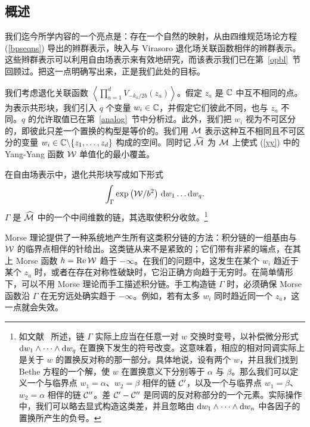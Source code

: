 \subsection{概述}\label{moreover}

我们迄今所学内容的一个亮点是：存在一个自然的映射，从由四维规范场论方程 (\ref{bpseqns}) 导出的辫群表示，映入与 Virasoro 退化场关联函数相伴的辫群表示。这些辫群表示可以利用自由场表示来有效地研究，而该表示我们已在第~\ref{opbl}~节回顾过。把这一点明确写出来，正是我们此处的目标。

我们考虑退化关联函数 $\left\langle \prod_{a=1}^d V_{-k_a/2b}(z_a)
\right\rangle$。假定 $z_a$ 是 ${\mathbb C}$ 中互不相同的点。为表示共形块，我们引入 $q$ 个变量 $w_i\in {\mathbb C}$，并假定它们彼此不同，也与 $z_a$ 不同。$q$ 的允许取值已在第~\ref{analog}~节中分析过。此外，我们把 $w_i$ 视为不可区分的，即彼此只差一个置换的构型是等价的。我们用 ${\mathcal M}$ 表示这种互不相同且不可区分的变量 $w_i\in {\mathbb C}\backslash\{z_1,\dots,z_d\}$ 构成的空间。同时记 $\widehat {{\mathcal M}}$ 为 ${\mathcal M}$ 上使式 (\ref{yy}) 中的 Yang-Yang 函数 ${\mathcal W}$ 单值化的最小覆盖。

在自由场表示中，退化共形块写成如下形式
\begin{equation}\label{dolf}\int_\Gamma \exp\left({\mathcal W}/b^2\right)\,{\mathrm d} w_1\dots
{\mathrm d} w_q.\end{equation} $\Gamma $ 是 $\widehat{{\mathcal M}}$ 中的一个中间维数的链，其选取使积分收敛。\footnote{如文献~\cite{Lawrence} 所述，链 $\Gamma$ 实际上应当在任意一对 $w$ 交换时变号，以补偿微分形式 ${\mathrm d} w_1\wedge\dots\wedge{\mathrm d} w_q$ 在置换下发生的符号改变。这意味着，相应的相对同调实际上是关于 $w$ 的置换反对称的那一部分。具体地说，设有两个 $w$，并且我们找到 Bethe 方程的一个解，使 $w$ 在置换意义下分别等于 $\alpha$ 与 $\beta$。那么我们可以定义一个与临界点 $w_1=\alpha$、$w_2=\beta$ 相伴的链 ${\mathcal C}'$，以及一个与临界点 $w_1=\beta$、$w_2=\alpha$ 相伴的链 ${\mathcal C}''$。差 ${\mathcal C}'-{\mathcal C}''$ 是同调的反对称部分的一个元素。实际操作中，我们可以略去显式构造这类差，并且忽略由 ${\mathrm d} w_1\wedge\dots\wedge {\mathrm d} w_n$ 中各因子的置换所产生的负号。}


Morse 理论提供了一种系统地产生所有这类积分链的方法：积分链的一组基由与 ${\mathcal W}$ 的临界点相伴的针给出。这类链从来不是紧致的；它们带有非紧的端点，在其上 Morse 函数 $h = \mathrm{Re} \,{\mathcal W}$ 趋于 $-\infty$。在我们的问题中，这发生在某个 $w_i$ 趋近于某个 $z_a$ 时，或者在存在对称性破缺时，它沿正确方向趋于无穷时。在简单情形下，可以不用 Morse 理论而手工描述积分链。手工构造链 $\Gamma$ 时，必须确保 Morse 函数沿 $\Gamma$ 在无穷远处确实趋于 $-\infty$。例如，若有太多 $w_i$ 同时趋近同一个 $z_a$，这一点就会失效。

